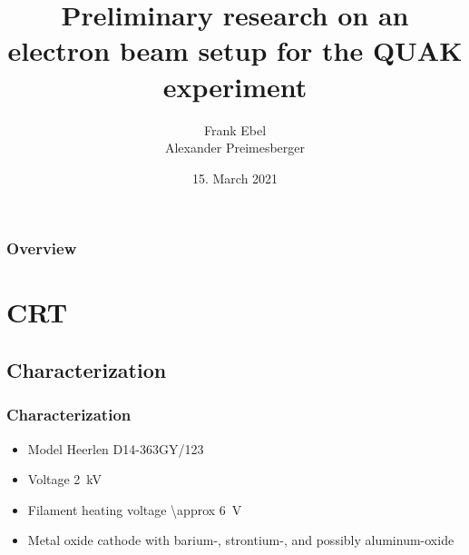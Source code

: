 \documentclass[aspectratio=169]{beamer}
\title[CRT]{Preliminary research on an electron beam setup for the QUAK experiment} %
\author{Frank Ebel\\ Alexander Preimesberger} %
\institute[TU] %
{
TU Wien \\ %
\medskip
01429282\\ 01427641
}
\date{15. March 2021} %
\begin{document}
\begin{frame}
\titlepage %
\end{frame}

\begin{frame}
\frametitle{Overview} %
\tableofcontents %
\end{frame}


\section{CRT} %

\subsection{Characterization} %

\begin{frame}
	\frametitle{Characterization}
	\begin{itemize}
		\item Model Heerlen D14-363GY/123
		\item Voltage \SI{2}{\kilo\volt}
		\item Filament heating voltage \SI{\approx 6}{\volt}
		\item Metal oxide cathode with barium-, strontium-, and possibly aluminum-oxide
	\end{itemize}
\end{frame}
\end{document}
